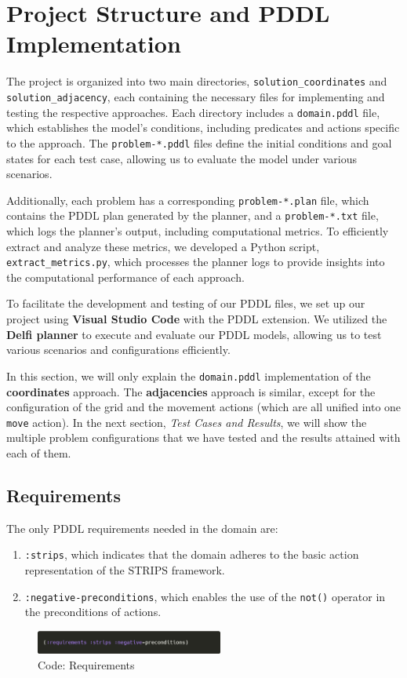 \documentclass{article}
\begin{document}
\section{Project Structure and PDDL Implementation}

The project is organized into two main directories, \texttt{solution\_coordinates} and \texttt{solution\_adjacency}, each containing the necessary files for implementing and testing the respective approaches. Each directory includes a \texttt{domain.pddl} file, which establishes the model's conditions, including predicates and actions specific to the approach. The \texttt{problem-*.pddl} files define the initial conditions and goal states for each test case, allowing us to evaluate the model under various scenarios.

Additionally, each problem has a corresponding \texttt{problem-*.plan} file, which contains the PDDL plan generated by the planner, and a \texttt{problem-*.txt} file, which logs the planner's output, including computational metrics. To efficiently extract and analyze these metrics, we developed a Python script, \texttt{extract\_metrics.py}, which processes the planner logs to provide insights into the computational performance of each approach.

To facilitate the development and testing of our PDDL files, we set up our project using \textbf{Visual Studio Code} with the PDDL extension. We utilized the \textbf{Delfi planner} to execute and evaluate our PDDL models, allowing us to test various scenarios and configurations efficiently.

In this section, we will only explain the \texttt{domain.pddl} implementation of the \textbf{coordinates} approach. The \textbf{adjacencies} approach is similar, except for the configuration of the grid and the movement actions (which are all unified into one \texttt{move} action). In the next section, \textit{Test Cases and Results}, we will show the multiple problem configurations that we have tested and the results attained with each of them.

\subsection{Requirements}
The only PDDL requirements needed in the domain are:
\begin{enumerate}
    \item \texttt{:strips}, which indicates that the domain adheres to the basic action representation of the STRIPS framework.
    \item \texttt{:negative-preconditions}, which enables the use of the \texttt{not()} operator in the preconditions of actions.
\end{enumerate}
\begin{figure}[ht]
    \centering
    \includegraphics[width=0.55\textwidth]{assets/solution_coordinates/requirements.png}
    \caption{Code: Requirements}
    \label{fig:req}
\end{figure}
\end{document}
